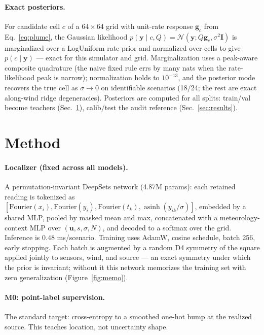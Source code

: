 \documentclass{article}
\begin{document}
\paragraph{Exact posteriors.} For candidate cell $c$ of a $64\times64$ grid with unit-rate
response $\boldsymbol{g}_c$ from Eq.~\eqref{eq:plume}, the Gaussian likelihood
$p(\boldsymbol{y}\mid c, Q) = \mathcal{N}(\boldsymbol{y}; Q\boldsymbol{g}_c, \sigma^2\mathbf{I})$ is
marginalized over a LogUniform rate prior and normalized over cells to give
$p(c\mid\boldsymbol{y})$ --- exact for this simulator and grid. Marginalization uses a
peak-aware composite quadrature (the naive fixed rule errs by many nats when the
rate-likelihood peak is narrow); normalization holds to $10^{-13}$, and the posterior mode
recovers the true cell as $\sigma \to 0$ on identifiable scenarios (18/24; the rest are
exact along-wind ridge degeneracies). Posteriors are computed for all splits: train/val
become teachers (Sec.~\ref{sec:method}), calib/test the audit reference
(Sec.~\ref{sec:results}).

\section{Method}
\label{sec:method}

\paragraph{Localizer (fixed across all models).} A permutation-invariant DeepSets network
(4.87M params): each retained reading is tokenized as
$[\mathrm{Fourier}(x_i), \mathrm{Fourier}(y_i), \mathrm{Fourier}(t_k),
\operatorname{asinh}(y_{ik}/\sigma)]$, embedded by a shared MLP, pooled by masked mean and
max, concatenated with a meteorology-context MLP over $(\boldsymbol{u}, s, \sigma, N)$, and
decoded to a softmax over the grid. Inference is $0.48$ ms/scenario. Training uses AdamW,
cosine schedule, batch 256, early stopping. Each batch is augmented by a random D4 symmetry
of the square applied jointly to sensors, wind, and source --- an exact symmetry under
which the prior is invariant; without it this network memorizes the training set with zero
generalization (Figure~\ref{fig:memo}).

\paragraph{M0: point-label supervision.} The standard target: cross-entropy to a smoothed
one-hot bump at the realized source. This teaches location, not uncertainty shape.
\end{document}
